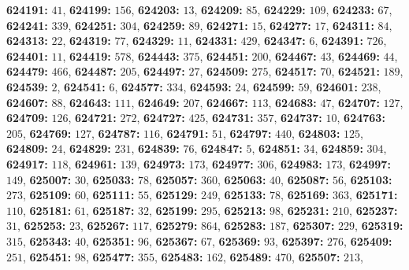 \textsf{\bfseries 624191:} $41$, \textsf{\bfseries 624199:} $156$, \textsf{\bfseries 624203:} $13$, \textsf{\bfseries 624209:} $85$, \textsf{\bfseries 624229:} $109$, \textsf{\bfseries 624233:} $67$, \textsf{\bfseries 624241:} $339$, \textsf{\bfseries 624251:} $304$, \textsf{\bfseries 624259:} $89$, \textsf{\bfseries 624271:} $15$, \textsf{\bfseries 624277:} $17$, \textsf{\bfseries 624311:} $84$, \textsf{\bfseries 624313:} $22$, \textsf{\bfseries 624319:} $77$, \textsf{\bfseries 624329:} $11$, \textsf{\bfseries 624331:} $429$, \textsf{\bfseries 624347:} $6$, \textsf{\bfseries 624391:} $726$, \textsf{\bfseries 624401:} $11$, \textsf{\bfseries 624419:} $578$, \textsf{\bfseries 624443:} $375$, \textsf{\bfseries 624451:} $200$, \textsf{\bfseries 624467:} $43$, \textsf{\bfseries 624469:} $44$, \textsf{\bfseries 624479:} $466$, \textsf{\bfseries 624487:} $205$, \textsf{\bfseries 624497:} $27$, \textsf{\bfseries 624509:} $275$, \textsf{\bfseries 624517:} $70$, \textsf{\bfseries 624521:} $189$, \textsf{\bfseries 624539:} $2$, \textsf{\bfseries 624541:} $6$, \textsf{\bfseries 624577:} $334$, \textsf{\bfseries 624593:} $24$, \textsf{\bfseries 624599:} $59$, \textsf{\bfseries 624601:} $238$, \textsf{\bfseries 624607:} $88$, \textsf{\bfseries 624643:} $111$, \textsf{\bfseries 624649:} $207$, \textsf{\bfseries 624667:} $113$, \textsf{\bfseries 624683:} $47$, \textsf{\bfseries 624707:} $127$, \textsf{\bfseries 624709:} $126$, \textsf{\bfseries 624721:} $272$, \textsf{\bfseries 624727:} $425$, \textsf{\bfseries 624731:} $357$, \textsf{\bfseries 624737:} $10$, \textsf{\bfseries 624763:} $205$, \textsf{\bfseries 624769:} $127$, \textsf{\bfseries 624787:} $116$, \textsf{\bfseries 624791:} $51$, \textsf{\bfseries 624797:} $440$, \textsf{\bfseries 624803:} $125$, \textsf{\bfseries 624809:} $24$, \textsf{\bfseries 624829:} $231$, \textsf{\bfseries 624839:} $76$, \textsf{\bfseries 624847:} $5$, \textsf{\bfseries 624851:} $34$, \textsf{\bfseries 624859:} $304$, \textsf{\bfseries 624917:} $118$, \textsf{\bfseries 624961:} $139$, \textsf{\bfseries 624973:} $173$, \textsf{\bfseries 624977:} $306$, \textsf{\bfseries 624983:} $173$, \textsf{\bfseries 624997:} $149$, \textsf{\bfseries 625007:} $30$, \textsf{\bfseries 625033:} $78$, \textsf{\bfseries 625057:} $360$, \textsf{\bfseries 625063:} $40$, \textsf{\bfseries 625087:} $56$, \textsf{\bfseries 625103:} $273$, \textsf{\bfseries 625109:} $60$, \textsf{\bfseries 625111:} $55$, \textsf{\bfseries 625129:} $249$, \textsf{\bfseries 625133:} $78$, \textsf{\bfseries 625169:} $363$, \textsf{\bfseries 625171:} $110$, \textsf{\bfseries 625181:} $61$, \textsf{\bfseries 625187:} $32$, \textsf{\bfseries 625199:} $295$, \textsf{\bfseries 625213:} $98$, \textsf{\bfseries 625231:} $210$, \textsf{\bfseries 625237:} $31$, \textsf{\bfseries 625253:} $23$, \textsf{\bfseries 625267:} $117$, \textsf{\bfseries 625279:} $864$, \textsf{\bfseries 625283:} $187$, \textsf{\bfseries 625307:} $229$, \textsf{\bfseries 625319:} $315$, \textsf{\bfseries 625343:} $40$, \textsf{\bfseries 625351:} $96$, \textsf{\bfseries 625367:} $67$, \textsf{\bfseries 625369:} $93$, \textsf{\bfseries 625397:} $276$, \textsf{\bfseries 625409:} $251$, \textsf{\bfseries 625451:} $98$, \textsf{\bfseries 625477:} $355$, \textsf{\bfseries 625483:} $162$, \textsf{\bfseries 625489:} $470$, \textsf{\bfseries 625507:} $213$, 
